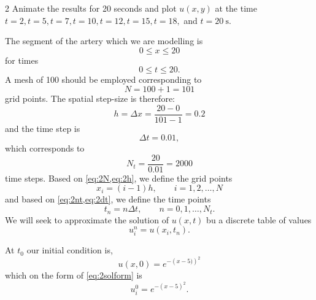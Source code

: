 \begin{problem}{2}
    Animate the results for 20 seconds and plot $u(x,y)$ at the time $t = 2, t = 5, t = 7, t= 10, t = 12, t = 15, t = 18, $ and $t = \qty{20}{\s}$.
  \end{problem}

  \begin{derivation}
    The segment of the artery which we are modelling is
    \begin{equation}
      0 \leq x \leq 20
    \end{equation}
    for times
    \begin{equation}
      0 \leq t \leq 20
    .\end{equation}
    A mesh of 100 should be employed corresponding to
    \begin{equation} \label{eq:2N}
      N = 100 + 1 = 101
    \end{equation}
    grid points.
    The spatial step-size is therefore:
    \begin{equation} \label{eq:2h}
      h = \Delta x = \frac{20 - 0}{101- 1} = \num{0,2} 
    \end{equation}
    and the time step is
    \begin{equation} \label{eq:2dt}
      \Delta t = \num{0,01}
    ,\end{equation}
    which corresponds to 
    \begin{equation} \label{eq:2nt}
      N_t = \frac{20}{\num{0,01}} = \num{2000} 
    \end{equation}
    time steps.
    Based on \cref{eq:2N,eq:2h}, we define the grid points
    \begin{equation}
      x_i = (i-1) h, \qquad i = 1,2,\ldots ,N
    \end{equation}
    and based on \cref{eq:2nt,eq:2dt}, we define the time points
    \begin{equation}
      t_n = n \Delta t, \qquad n = 0,1,\ldots ,N_t
    .\end{equation}
    We will seek to approximate the solution of $u(x,t)$ bu a discrete table of values
    \begin{equation} \label{eq:2solform}
      u_{i}^{n} = u(x_i, t_n)
    .\end{equation}
    
    
    At $t_0$ our initial condition is,
    \begin{equation}
      u(x,0) = e^{- \left( x-5) \right)^2}
    \end{equation}
    which on the form of \cref{eq:2solform} is
    \begin{equation*}
      u_i^{0} = e^{- \left( x-5 \right)^2}
    .\end{equation*}
    

\end{derivation}
